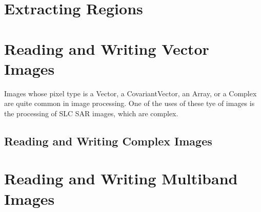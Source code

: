 \section{Extracting Regions}
\label{sec:ImagReadRegionOfInterestWrite}


%


\section{Reading and Writing Vector Images}
\label{sec:VectorImagReadWrite}

Images whose pixel type is a Vector, a CovariantVector, an Array, or a Complex
are quite common in image processing. One of the uses of these tye of
images is the processing of SLC SAR images, which are complex.


%

%

%


\subsection{Reading and Writing Complex Images}
\label{sec:ComplexImagReadWrite}


\section{Reading and Writing Multiband Images}
\label{sec:MultibandImagReadWrite}



